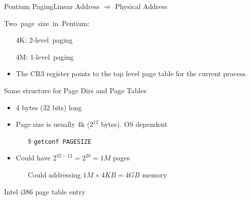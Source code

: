 \begin{frame}{Pentium Paging}{Linear Address $\Rightarrow$ Physical Address}
  \begin{varwidth}{.4\textwidth}
    \mbox{Two page size in Pentium:}
    \begin{small}
      \begin{itemize}
      \item[4K:] \mbox{2-level paging}%
      \item[4M:] \mbox{1-level paging}%
      \end{itemize}
    \end{small}
    \begin{center}
    \end{center}
  \end{varwidth}\qquad
  \begin{varwidth}{.5\textwidth}
    \begin{center}
    \end{center}
  \end{varwidth}
\end{frame}

\begin{itemize}
\item The CR3 register points to the top level page table for the current process.
\end{itemize}

\begin{frame}%
  \begin{block}{Same structure for Page Dirs and Page Tables}
    \begin{itemize}
    \item 4 bytes (32 bits) long
    \item Page size is usually 4k ($2^{12}$ bytes). OS dependent
      \begin{itemize}
      \item[\$] \texttt{getconf PAGESIZE}
      \end{itemize}
    \item Could have $2^{32-12}=2^{20}=1M$ pages
      \begin{itemize}
      \item[] Could addressing $1M\times{}4KB=4GB$ memory
      \end{itemize}
    \end{itemize}
  \end{block}
  \begin{block}{Intel i386 page table entry}
    \begin{center}
    \end{center}
  \end{block}
\end{frame}

